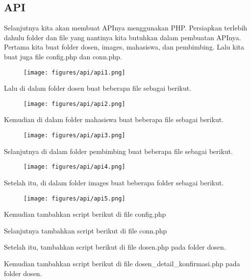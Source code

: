 \subsection{API}
Selanjutnya kita akan membuat APInya menggunakan PHP. Persiapkan terlebih dahulu folder dan file yang nantinya kita butuhkan dalam pembuatan APInya. Pertama kita buat folder dosen, images, mahasiswa, dan pembimbing. Lalu kita buat juga file config.php dan conn.php.

\begin{figure}[H]
\centering
\texttt{[image: figures/api/api1.png]}
\end{figure}

\noindent
Lalu di dalam folder dosen buat beberapa file sebagai berikut.

\begin{figure}[H]
\centering
\texttt{[image: figures/api/api2.png]}
\end{figure}

\noindent
Kemudian di dalam folder mahasiswa buat beberapa file sebagai berikut.

\begin{figure}[H]
\centering
\texttt{[image: figures/api/api3.png]}
\end{figure}

\noindent
Selanjutnya di dalam folder pembimbing buat beberapa file sebagai berikut.

\begin{figure}[H]
\centering
\texttt{[image: figures/api/api4.png]}
\end{figure}

\noindent
Setelah itu, di dalam folder images buat beberapa folder sebagai berikut.

\begin{figure}[H]
\centering
\texttt{[image: figures/api/api5.png]}
\end{figure}

\noindent
Kemudian tambahkan script berikut di file config.php


\noindent
Selanjutnya tambahkan script berikut di file conn.php


\noindent
Setelah itu, tambahkan script berikut di file dosen.php pada folder dosen.


\noindent
Kemudian tambahkan script berikut di file dosen\_detail\_konfirmasi.php pada folder dosen.


